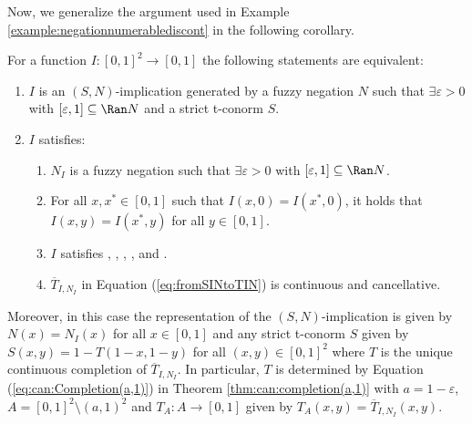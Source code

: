 Now, we generalize the argument used in Example \ref{example:negationnumerablediscont} in the following corollary.

\begin{corollary}\label{cors:characterization(S,N)_strict_disctpoints}
		For a function $I:[0,1]^2 \to [0,1]$ the following statements are equivalent:
		\begin{enumerate}[label=(\roman*)]
			\item $I$ is an $(S,N)$-implication  generated by a fuzzy negation $N$ such that $\exists \varepsilon>0$ with $[\varepsilon,1] \subseteq \Ran N$ and a strict t-conorm $S$.
			\item $I$ satisfies:
			\begin{enumerate}
				\item $N_I$ is a fuzzy negation such that $\exists \varepsilon>0$ with $[\varepsilon,1] \subseteq \Ran N$.
				\item For all $x,x^*\in[0,1]$ such that $I(x,0)=I(x^*,0)$, it holds that $I(x,y)=I(x^*,y)$ for all $y\in[0,1]$.
				\item $I$ satisfies \Ione, \Itwo, \NP, \EP, \Rone and \Rtwo.
				\item $\overline{T}_{I,N_I}$ in Equation (\ref{eq:fromSINtoTIN}) is continuous and cancellative.
			\end{enumerate}
		\end{enumerate}
		Moreover,  in this case the representation of the $(S,N)$-implication is given by $N(x)=N_I(x)$ for all $x \in [0,1]$ and any strict t-conorm $S$ given by $S(x,y)=1-T(1-x,1-y)$ for all $(x,y) \in [0,1]^2$ where $T$ is the unique continuous completion of $\overline{T}_{I,N_I}$. In particular,  $T$ is determined by Equation (\ref{eq:can:Completion(a,1)}) in Theorem \ref{thm:can:completion(a,1)} with $a=1-\varepsilon$, $A=[0,1]^2 \setminus (a,1)^2$ and $T_A : A \to [0,1]$ given by $T_A(x,y)=\overline{T}_{I,N_I}(x,y)$. 
\end{corollary}
